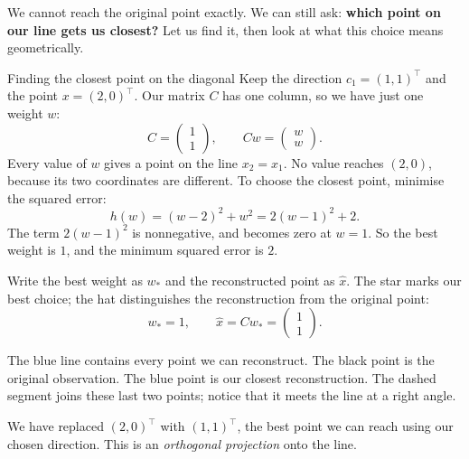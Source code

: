 \documentclass[a4paper,12pt,oneside]{report}
\begin{document}
We cannot reach the original point exactly. We can still ask:
\textbf{which point on our line gets us closest?}
Let us find it, then look at what this choice means geometrically.

\begin{framedexample}{Finding the closest point on the diagonal}
Keep the direction $c_1=(1,1)^\top$ and the point $x=(2,0)^\top$.
Our matrix $C$ has one column, so we have just one weight $w$:
\[
  C=\begin{pmatrix}1\\1\end{pmatrix},\qquad
  Cw=\begin{pmatrix}w\\w\end{pmatrix}.
\]
Every value of $w$ gives a point on the line $x_2=x_1$.
No value reaches $(2,0)$, because its two coordinates are different.
To choose the closest point, minimise the squared error:
\[
  h(w)=(w-2)^2+w^2=2(w-1)^2+2.
\]
The term $2(w-1)^2$ is nonnegative, and becomes zero at $w=1$.
So the best weight is $1$, and the minimum squared error is $2$.

Write the best weight as $w_*$ and the reconstructed point as
$\hat{x}$. The star marks our best choice; the hat distinguishes
the reconstruction from the original point:
\[
  w_*=1,\qquad
  \hat{x}=Cw_*=\begin{pmatrix}1\\1\end{pmatrix}.
\]

\begin{center}
\end{center}

The blue line contains every point we can reconstruct. The black
point is the original observation. The blue point is our closest
reconstruction. The dashed segment joins these last two points;
notice that it meets the line at a right angle.

We have replaced $(2,0)^\top$ with $(1,1)^\top$, the best point we
can reach using our chosen direction. This is an
\emph{orthogonal projection} onto the line.
\end{framedexample}
\end{document}
